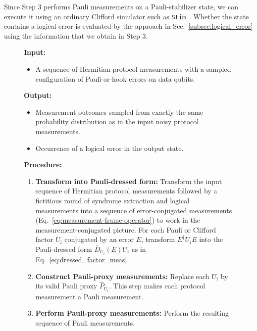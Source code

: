 \documentclass[
 reprint,
 amsmath,amssymb,
 pra,superscriptaddress, nofootinbib
]{revtex4-2}
\theoremstyle{definition}
\theoremstyle{plain}
\begin{document}
Since Step $3$ performs Pauli measurements on a Pauli-stabilizer state, we can execute it using an ordinary Clifford simulator such as \texttt{Stim}~\cite{Gidney2021stimfaststabilizer}. 
Whether the state contains a logical error is evaluated by the approach in Sec.~\ref{subsec:logical_error} using the information that we obtain in Step $3$.
\begin{figure}[tb]
\normalsize
\begin{algorithm}\label{alg:operator}
\leavevmode\par
\medskip
\noindent\textbf{Input:}\par
\noindent

\begin{itemize}
    \item A sequence of Hermitian protocol measurements with a sampled configuration of Pauli-or-hook errors on data qubits.
\end{itemize}

\noindent\textbf{Output:}\par
\noindent
\begin{itemize}
    \item Measurement outcomes sampled from exactly the same probability distribution as in the input noisy protocol measurements.
    \item Occurrence of a logical error in the output state.
\end{itemize}

\noindent\textbf{Procedure:}\par
\begin{enumerate}[label=\textbf{\arabic*.}]
  \item \textbf{Transform into Pauli-dressed form:} Transform the input sequence of Hermitian protocol measurements followed by a fictitious round of syndrome extraction and logical measurements into a sequence of error-conjugated measurements (Eq.~\eqref{eq:measurement-frame-operator}) to work in the measurement-conjugated picture. For each Pauli or Clifford factor $U_i$ conjugated by an error $E$, transform $E^\dagger U_iE$ into the Pauli-dressed form $\bar{D}_{U_i}(E)U_i$ as in 
  Eq.~\eqref{eq:dressed_factor_meas}.
  \item \textbf{Construct Pauli-proxy measurements:} Replace each $U_i$ by its valid Pauli proxy $\hat{P}_{U_i}$. This step makes each protocol measurement a Pauli measurement. 
  \item \textbf{Perform Pauli-proxy measurements:} Perform the resulting sequence of Pauli measurements.
\end{enumerate}
\end{algorithm}
\end{figure}
\end{document}
